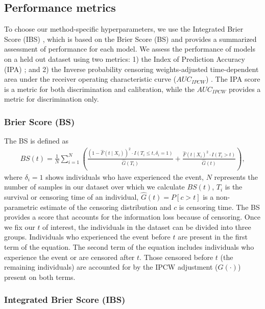\documentclass[preprint,12pt]{elsarticle}
\begin{document}
\hypertarget{performance-metrics}{%
\subsection{Performance metrics}\label{performance-metrics}}

To choose our method-specific hyperparameters, we use the Integrated Brier Score (IBS) \citep{graf1999}, which is based on the
Brier Score (BS) and provides a summarized assessment of performance for each model. We assess the performance of models on
a held out dataset using two metrics: 1) the Index of Prediction Accuracy (IPA) \citep{kattan2018index}; and 2) the Inverse probability
censoring weights-adjusted time-dependent area under the receiver operating characteristic curve ($AUC_{IPCW}$) \citep{auc}. The
IPA score is a metric for both discrimination and calibration, while the $AUC_{IPCW}$ provides a metric for discrimination only.

\hypertarget{bs}{%
\subsubsection{Brier Score (BS)}\label{bs}}
The BS \citep{graf1999} is defined as \begin{align}\label{eqn:bs}
BS(t)=\frac{1}{N}\sum^{N}_{i=1}\left(\frac{\left(1 - \widehat{F}(t \mid X_{i})\right)^{2}\cdot I(T_{i}\leq t,\delta_{i}=1)}{\widehat{G}(T_{i})} + \frac{\widehat{F}(t\mid X_{i})^{2}\cdot I(T_{i}>t)}{\widehat{G}(t)}\right),
\end{align} where \(\delta_{i}=1\) shows individuals who have experienced the event, \(N\) represents the number of samples
in our dataset over which we calculate \(BS(t)\), \(T_{i}\) is the survival or censoring time of an individual, \(\widehat{G}(t)=P[c>t]\) is a non-parametric estimate of the censoring distribution and \(c\) is censoring time. The BS provides a score that accounts for the
information loss because of censoring. Once we fix our \(t\) of interest, the individuals in the dataset can be divided into three
groups. Individuals who experienced the event before \(t\) are present in the first term of the equation. The second term of the
equation includes individuals who experience the event or are censored after \(t\). Those censored before \(t\) (the remaining
individuals) are accounted for by the IPCW adjustment (\(G(\cdot)\)) present on both terms.


\hypertarget{integrated-brier-score-ibs}{%
\subsubsection{Integrated Brier Score (IBS)}\label{integrated-brier-score-ibs}}
\end{document}
